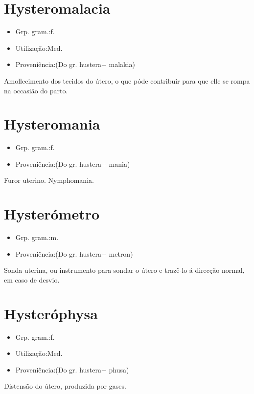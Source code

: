 \documentclass{article}
\begin{document}
\section{Hysteromalacia}
\begin{itemize}
\item {Grp. gram.:f.}
\end{itemize}
\begin{itemize}
\item {Utilização:Med.}
\end{itemize}
\begin{itemize}
\item {Proveniência:(Do gr. \textunderscore hustera\textunderscore  + \textunderscore malakia\textunderscore )}
\end{itemize}
Amollecimento dos tecidos do útero, o que póde contribuir para que elle se rompa na occasião do parto.
\section{Hysteromania}
\begin{itemize}
\item {Grp. gram.:f.}
\end{itemize}
\begin{itemize}
\item {Proveniência:(Do gr. \textunderscore hustera\textunderscore  + \textunderscore mania\textunderscore )}
\end{itemize}
Furor uterino.
Nymphomania.
\section{Hysterómetro}
\begin{itemize}
\item {Grp. gram.:m.}
\end{itemize}
\begin{itemize}
\item {Proveniência:(Do gr. \textunderscore hustera\textunderscore  + \textunderscore metron\textunderscore )}
\end{itemize}
Sonda uterina, ou instrumento para sondar o útero e trazê-lo á direcção normal, em caso de desvio.
\section{Hysteróphysa}
\begin{itemize}
\item {Grp. gram.:f.}
\end{itemize}
\begin{itemize}
\item {Utilização:Med.}
\end{itemize}
\begin{itemize}
\item {Proveniência:(Do gr. \textunderscore hustera\textunderscore  + \textunderscore phusa\textunderscore )}
\end{itemize}
Distensão do útero, produzida por gases.
\end{document}
